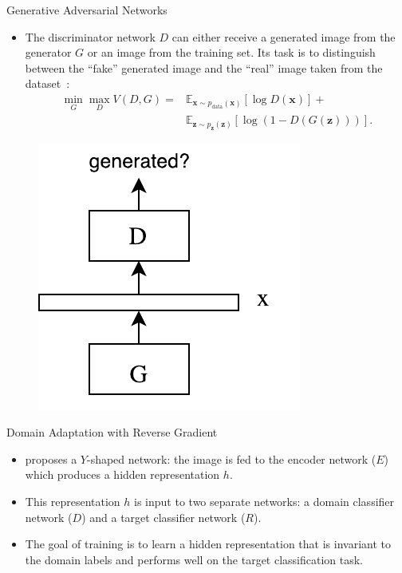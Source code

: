 \documentclass[final]{beamer}
\newlength{\onecolwid}
\begin{document}
\begin{frame}[t]
\begin{columns}[t]
\begin{column}{\onecolwid}
\begin{block}{Generative Adversarial Networks}
\begin{itemize}
        \item The discriminator network $D$
    can either receive a generated image from the generator $G$ or an image
    from the training set. Its task is to distinguish
    between the ``fake'' generated image and the ``real'' image taken from the dataset~\cite{goodfellow2014generative}:
    \begin{align*}
        \min_G \max_D V(D, G) = & \mathbb{E}_{\bm{x} \sim p_{\text{data}}(\bm{x})}[\log D(\bm{x})] + \\
            & \mathbb{E}_{\bm{z} \sim p_{\bm{z}}(\bm{z})}[\log (1 - D(G(\bm{z})))].
    \end{align*}

    \end{itemize}
    \begin{figure}
        \centering
        \includegraphics[width=0.5\linewidth]{gan.pdf}
    \end{figure}
\end{block}


\begin{block}{Domain Adaptation with Reverse Gradient}
    \begin{itemize}
        \item \cite{ganin2014unsupervised} proposes a $Y$-shaped network: the image is fed to the
        encoder network ($E$) which produces a hidden representation $h$. 
        
        \item This representation $h$ is input to two separate networks: a domain classifier network ($D$) and 
        a target classifier network ($R$). 
        
        \item The goal of training is to learn a hidden 
        representation that is invariant to the domain labels and performs well on the target classification 
        task. 
        

\end{itemize}
\end{block}
\end{column}
\end{columns}
\end{frame}
\end{document}

